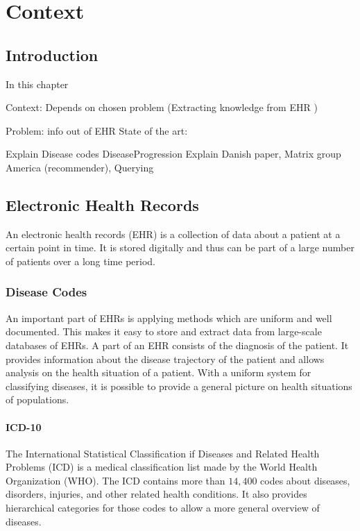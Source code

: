 \graphicspath{ {Context/Images/} }


\chapter{Context}
\label{cha:context}

\section{Introduction}
In this chapter 

Context: Depends on chosen problem (Extracting knowledge from EHR )

	Problem: info out of EHR
	State of the art:
	
		Explain Disease codes
		DiseaseProgression
		Explain Danish paper, Matrix group America (recommender), Querying


\section{Electronic Health Records}

An electronic health records (EHR) is a collection of data about a patient at a certain point in time. It is stored digitally and thus can be part of a large number of patients over a long time period.

\subsection{Disease Codes}

An important part of EHRs is applying methods which are uniform and well documented. This makes it easy to store and extract data from large-scale databases of EHRs. A part of an EHR consists of the diagnosis of the patient. It provides information about the disease trajectory of the patient and allows analysis on the health situation of a patient. With a uniform system for classifying diseases, it is possible to provide a general picture on health situations of populations.

\subsubsection{ICD-10}

The International Statistical Classification if Diseases and Related Health Problems (ICD) is a medical classification list made by the World Health Organization (WHO). The ICD contains more than $14,400$ codes about diseases, disorders, injuries, and other related health conditions. It also provides hierarchical categories for those codes to allow a more general overview of diseases.


